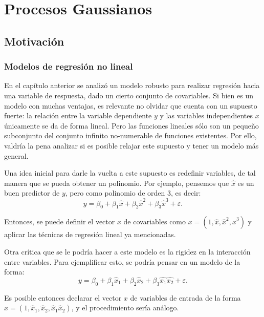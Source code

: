 \chapter[Procesos Gaussianos]{Procesos Gaussianos}

\section{Motivaci\'on}

\subsection[Modelos de regresi\'on no lineal]{
    Modelos de regresi\'on no lineal
}

En el cap\'itulo anterior se analiz\'o un modelo robusto para realizar regresi\'on hacia una variable de respuesta, dado un cierto conjunto de covariables. Si bien es un modelo con muchas ventajas, es relevante no olvidar que cuenta con un supuesto fuerte: la relación entre la variable dependiente $y$ y las variables independientes $x$ \'unicamente se da de forma lineal. Pero las funciones lineales s\'olo son un pequeño subconjunto del conjunto infinito no-numerable de funciones existentes. Por ello, valdr\'ia la pena analizar si es posible relajar este supuesto y tener un modelo m\'as general.

Una idea inicial para darle la vuelta a este supuesto es redefinir variables, de tal manera que se pueda obtener un polinomio. Por ejemplo, pensemos que $\hat{x}$ es un buen predictor de $y$, pero como polinomio de orden 3, es decir:
\begin{equation*}
    y = \beta_0 + \beta_1\hat{x} + \beta_2\hat{x}^2 + \beta_3\hat{x}^3 + \varepsilon.
\end{equation*}

Entonces, se puede definir el vector $x$ de covariables como $x = (1,\hat{x},\hat{x}^2,\hat{x}^3)$ y aplicar las t\'ecnicas de regresi\'on lineal ya mencionadas.

Otra cr\'itica que se le podr\'ia hacer a este modelo es la rigidez en la interacci\'on entre variables. Para ejemplificar esto, se podr\'ia pensar en un modelo de la forma:
\begin{equation*}
    y = \beta_0 + \beta_1\hat{x}_1 + \beta_2\hat{x}_2 + \beta_3\hat{x_1}\hat{x_2} + \varepsilon.
\end{equation*}

Es posible entonces declarar el vector $x$ de variables de entrada de la forma $x = (1,\hat{x}_1,\hat{x}_2,\hat{x}_1\hat{x}_2)$, y el procedimiento ser\'ia an\'alogo.

